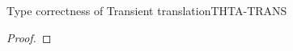 \documentclass[acmlarge, anonymous, authordraft, review]{acmart} %
\begin{document}
\begin{lemma}{Type correctness of Transient translation}{THTA-TRANS}
\begin{proof}
% 
% 
% 
  \end{proof}
\end{lemma}
\end{document}

